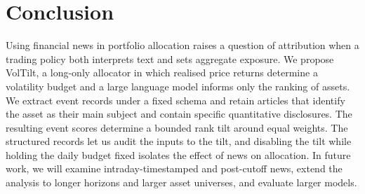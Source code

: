 \section{Conclusion}
\label{sec:conclusion}

Using financial news in portfolio allocation raises a question of attribution when a trading policy both interprets text and sets aggregate exposure. We propose VolTilt, a long-only allocator in which realised price returns determine a volatility budget and a large language model informs only the ranking of assets. We extract event records under a fixed schema and retain articles that identify the asset as their main subject and contain specific quantitative disclosures. The resulting event scores determine a bounded rank tilt around equal weights. The structured records let us audit the inputs to the tilt, and disabling the tilt while holding the daily budget fixed isolates the effect of news on allocation. In future work, we will examine intraday-timestamped and post-cutoff news, extend the analysis to longer horizons and larger asset universes, and evaluate larger models.
